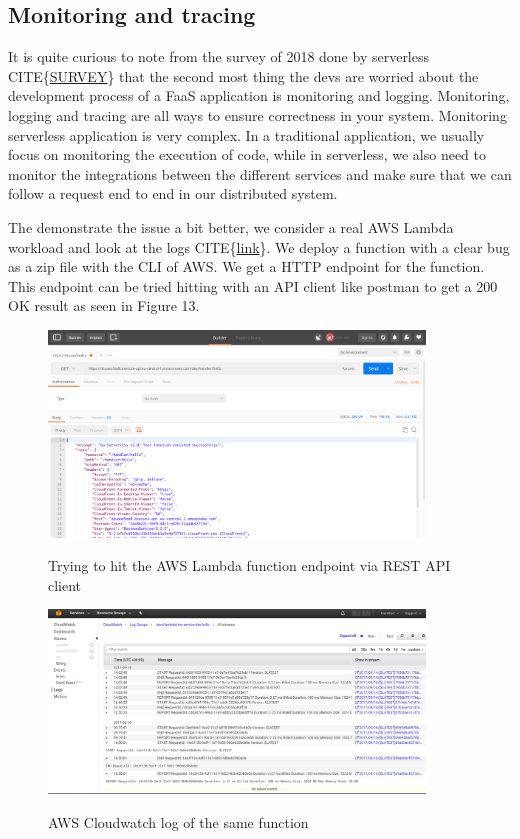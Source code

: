 \documentclass[12pt,titlepage]{article}
\begin{document}
\subsection{Monitoring and tracing}
\label{sec:orgb6a0cab}
It is quite curious to note from the survey of 2018 done by serverless CITE\{\href{https://www.serverless.com/blog/2018-serverless-community-survey-huge-growth-usage}{SURVEY}\} that the
second most thing the devs are worried about the development process of a FaaS
application is monitoring and logging. Monitoring, logging and tracing are all
ways to ensure correctness in your system. Monitoring serverless application is
very complex. In a traditional application, we usually focus on monitoring the
execution of code, while in serverless, we also need to monitor the integrations
between the different services and make sure that we can follow a request end to
end in our distributed system.

The demonstrate the issue a bit better, we consider a real AWS Lambda workload
and look at the logs CITE\{\href{https://www.serverless.com/blog/serverless-monitoring-the-good-the-bad-and-the-ugly}{link}\}. We deploy a function with a clear bug as a zip file with the
CLI of AWS. We get a HTTP endpoint for the function. This endpoint can be tried
hitting with an API client like postman to get a 200 OK result as seen in
Figure 13. 
\begin{figure}[!h]
    \caption{Trying to hit the AWS Lambda function endpoint via REST API client}
    \centering
    \includegraphics[width=100mm]{./thesis_images/postman.png}
    \label{fig:postman}
\end{figure}
\begin{figure}[!h]
    \caption{AWS Cloudwatch log of the same function}
    \centering
    \includegraphics[width=100mm]{./thesis_images/cloudwatch.png}
    \label{fig:cloudwatch}
\end{figure}
\end{document}
